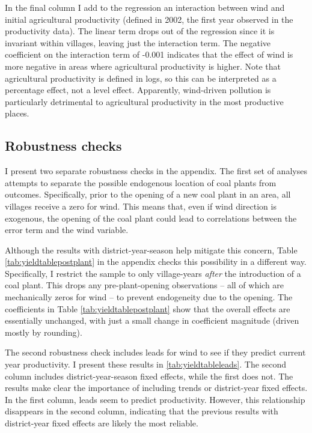 \documentclass[
]{article}
\begin{document}
In the final column I add to the regression an interaction between wind and initial agricultural productivity (defined in 2002, the first year observed in the productivity data). The linear term drops out of the regression since it is invariant within villages, leaving just the interaction term. The negative coefficient on the interaction term of -0.001 indicates that the effect of wind is more negative in areas where agricultural productivity is higher. Note that agricultural productivity is defined in logs, so this can be interpreted as a percentage effect, not a level effect. Apparently, wind-driven pollution is particularly detrimental to agricultural productivity in the most productive places.

\hypertarget{robustness-checks}{%
\subsection{Robustness checks}\label{robustness-checks}}

I present two separate robustness checks in the appendix. The first set of analyses attempts to separate the possible endogenous location of coal plants from outcomes. Specifically, prior to the opening of a new coal plant in an area, all villages receive a zero for wind. This means that, even if wind direction is exogenous, the opening of the coal plant could lead to correlations between the error term and the wind variable.

Although the results with district-year-season help mitigate this concern, Table \ref{tab:yieldtablepostplant} in the appendix checks this possibility in a different way. Specifically, I restrict the sample to only village-years \emph{after} the introduction of a coal plant. This drops any pre-plant-opening observations -- all of which are mechanically zeros for wind -- to prevent endogeneity due to the opening. The coefficients in Table \ref{tab:yieldtablepostplant} show that the overall effects are essentially unchanged, with just a small change in coefficient magnitude (driven mostly by rounding).

The second robustness check includes leads for wind to see if they predict current year productivity. I present these results in \ref{tab:yieldtableleads}. The second column includes district-year-season fixed effects, while the first does not. The results make clear the importance of including trends or district-year fixed effects. In the first column, leads seem to predict productivity. However, this relationship disappears in the second column, indicating that the previous results with district-year fixed effects are likely the most reliable.
\end{document}
